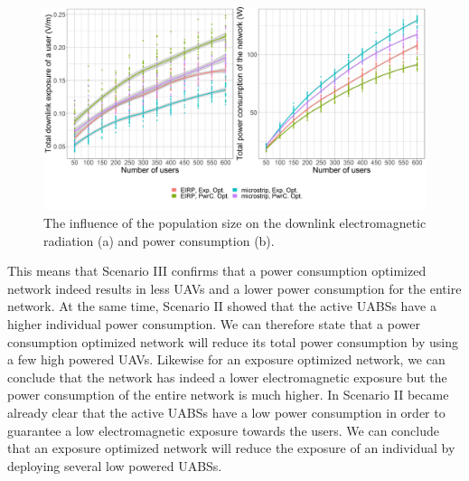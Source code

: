 \begin{figure}[h!]
  \includegraphics[width=\textwidth]{../results/s3/uvsdlAndPc.png}
  \caption{The influence of the population size on the downlink electromagnetic radiation (a) and power consumption (b).}
  \label{fig:s3b_dlAndPC}
\end{figure}
This means that Scenario III confirms that a power consumption optimized network indeed results in less \gls{UAV}s and a lower 
 power consumption for the entire network. 
At the same time, Scenario II showed that the active \gls{UABS}s have a higher individual power consumption.
We can therefore state that a power consumption optimized network will reduce its total power consumption by
using a few high powered \gls{UAV}s.
Likewise for an exposure optimized network, we can conclude that the network has indeed a lower electromagnetic exposure but the power consumption 
of the entire network is much higher. In Scenario II became already clear that the active \gls{UABS}s have a low power consumption in order to 
guarantee a low electromagnetic exposure towards the users.
We can conclude that an exposure optimized network will reduce the exposure of an individual 
by deploying several low powered \gls{UABS}s.

